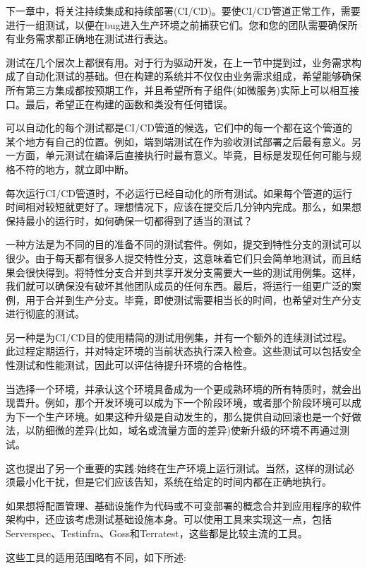 
下一章中，将关注持续集成和持续部署(CI/CD)。要使CI/CD管道正常工作，需要进行一组测试，以便在bug进入生产环境之前捕获它们。您和您的团队需要确保所有业务需求都正确地在测试进行表达。

测试在几个层次上都很有用。对于行为驱动开发，在上一节中提到过，业务需求构成了自动化测试的基础。但在构建的系统并不仅仅由业务需求组成，希望能够确保所有第三方集成都按预期工作，并且希望所有子组件(如微服务)实际上可以相互接口。最后，希望正在构建的函数和类没有任何错误。

可以自动化的每个测试都是CI/CD管道的候选，它们中的每一个都在这个管道的某个地方有自己的位置。例如，端到端测试在作为验收测试部署之后最有意义。另一方面，单元测试在编译后直接执行时最有意义。毕竟，目标是发现任何可能与规格不符的地方，就立即中断。

每次运行CI/CD管道时，不必运行已经自动化的所有测试。如果每个管道的运行时间相对较短就更好了。理想情况下，应该在提交后几分钟内完成。那么，如果想保持最小的运行时，如何确保一切都得到了适当的测试？

一种方法是为不同的目的准备不同的测试套件。例如，提交到特性分支的测试可以很少。由于每天都有很多人提交特性分支，这意味着它们只会简单地测试，而且结果会很快得到。将特性分支合并到共享开发分支需要大一些的测试用例集。这样，我们就可以确保没有破坏其他团队成员的任何东西。最后，将运行一组更广泛的案例，用于合并到生产分支。毕竟，即使测试需要相当长的时间，也希望对生产分支进行彻底的测试。

另一种是为CI/CD目的使用精简的测试用例集，并有一个额外的连续测试过程。此过程定期运行，并对特定环境的当前状态执行深入检查。这些测试可以包括安全性测试和性能测试，因此可以评估待提升环境的合格性。

当选择一个环境，并承认这个环境具备成为一个更成熟环境的所有特质时，就会出现晋升。例如，那个开发环境可以成为下一个阶段环境，或者那个阶段环境可以成为下一个生产环境。如果这种升级是自动发生的，那么提供自动回滚也是一个好做法，以防细微的差异(比如，域名或流量方面的差异)使新升级的环境不再通过测试。

这也提出了另一个重要的实践:始终在生产环境上运行测试。当然，这样的测试必须最小化干扰，但是它们应该告知，系统在给定的时间内都在正确地执行。


如果想将配置管理、基础设施作为代码或不可变部署的概念合并到应用程序的软件架构中，还应该考虑测试基础设施本身。可以使用工具来实现这一点，包括Serverspec、Testinfra、Goss和Terratest，这些都是比较主流的工具。

这些工具的适用范围略有不同，如下所述:


